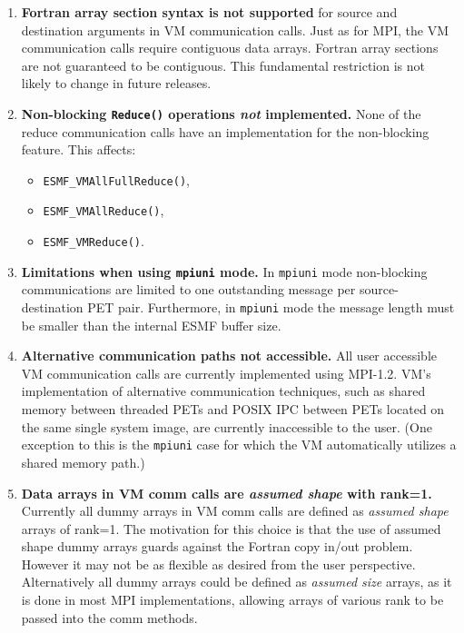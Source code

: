 

\begin{enumerate}

\item {\bf Fortran array section syntax is not supported} for source and
destination arguments in VM communication calls. Just as for MPI, the VM
communication calls require contiguous data arrays. Fortran array sections are
not guaranteed to be contiguous. This fundamental restriction is not likely to
change in future releases.

\item {\bf Non-blocking {\tt Reduce()} operations {\em not} implemented.} None of the reduce communication calls have an implementation for the non-blocking feature. This affects:
\begin{itemize}
\item {\tt ESMF\_VMAllFullReduce()},
\item {\tt ESMF\_VMAllReduce()},
\item {\tt ESMF\_VMReduce()}.
\end{itemize}

\item {\bf Limitations when using {\tt mpiuni} mode.} In {\tt mpiuni} mode non-blocking communications are limited to one outstanding message per source-destination PET pair. Furthermore, in {\tt mpiuni} mode the message length must be smaller than the internal ESMF buffer size.

\item {\bf Alternative communication paths not accessible.} All user accessible VM communication calls are currently implemented using MPI-1.2. VM's implementation of alternative communication techniques, such as shared memory between threaded PETs and POSIX IPC between PETs located on the same single system image, are currently inaccessible to the user. (One exception to this is the {\tt mpiuni} case for which the VM automatically utilizes a shared memory path.)

\item {\bf Data arrays in VM comm calls are {\em assumed shape} with rank=1.} Currently all dummy arrays in VM comm calls are defined as {\em assumed shape} arrays of rank=1. The motivation for this choice is that the use of assumed shape dummy arrays guards against the Fortran copy in/out problem. However it may not be as flexible as desired from the user perspective. Alternatively all dummy arrays could be defined as {\em assumed size} arrays, as it is done in most MPI implementations, allowing arrays of various rank to be passed into the comm methods.

\end{enumerate}


